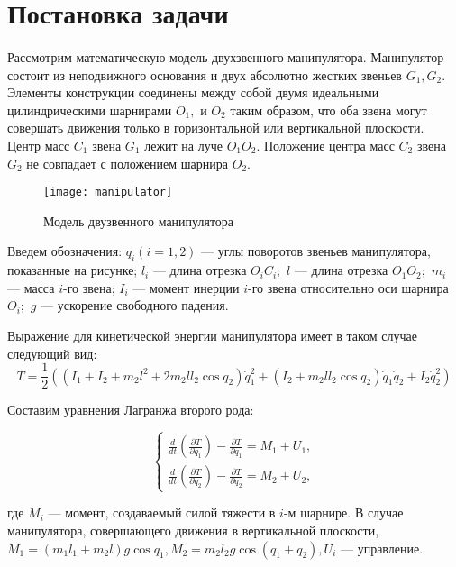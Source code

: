 \section{Постановка задачи} \label{p21}
\paragraph{}
Рассмотрим математическую модель двухзвенного манипулятора. Манипулятор состоит из неподвижного основания и двух абсолютно жестких звеньев $G_1, G_2$. Элементы конструкции соединены между собой двумя идеальными цилиндрическими шарнирами $O_1,$ и $O_2$ таким образом, что оба звена могут совершать движения только в горизонтальной или вертикальной плоскости. Центр масс $C_1$ звена $G_1$ лежит на луче $O_1 O_2.$ Положение центра масс $C_2$ звена $G_2$ не совпадает с положением шарнира $O_2$.

 \begin{figure}[h]
 	\centering
 	\texttt{[image: manipulator]}
 	\caption{Модель двузвенного манипулятора}
 	\label{fig:manip1}
 \end{figure}

Введем обозначения: $q_i (i=1, 2)$ --- углы поворотов звеньев манипулятора, показанные на рисунке; $l_i$ --- длина отрезка $O_i C_i;$ $l$ --- длина отрезка $O_1 O_2;$ $m_i$  ---  масса   $i$-го звена;   $I_i$ --- момент инерции  $i$-го звена относительно оси шарнира $O_i;$ $g$ --- ускорение свободного падения.

Выражение для кинетической энергии манипулятора имеет в таком случае следующий вид:
\begin{equation}
T = \frac12 ((I_1 + I_2 + m_2 l^2 + 2 m_2 l l_2 \cos q_2) \dot q_1^2 + (I_2 + m_2 l l_2 \cos q_2) \dot q_1 \dot q_2 + I_2 \dot q_2^2)
\end{equation}

Составим уравнения Лагранжа второго рода:

\begin{equation}
\begin{cases}
\frac{d}{dt} (\frac{\partial T}{\partial \dot q_1}) - \frac{\partial T}{\partial q_1} = M_1 + U_1, 
\\
\frac{d}{dt} (\frac{\partial T}{\partial \dot q_2}) - \frac{\partial T}{\partial q_2} = M_2 + U_2,
\end{cases}
\end{equation}

где $M_i$ --- момент, создаваемый силой тяжести в $i$-м шарнире. В случае манипулятора, совершающего движения в вертикальной плоскости, $M_1 = (m_1 l_1 + m_2 l) g \cos q_1, M_2 = m_2 l_2 g \cos (q_1 + q_2), U_i $ --- управление.

